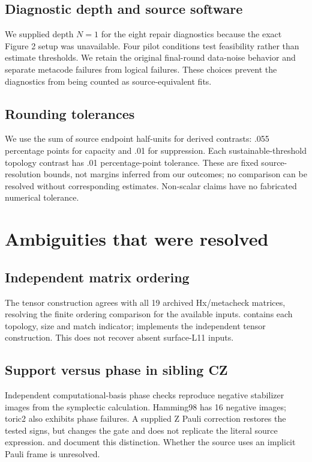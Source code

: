 \subsection{Diagnostic depth and source software}
We supplied depth $N=1$ for the eight repair diagnostics because the exact Figure 2 setup was unavailable. Four pilot conditions test feasibility rather than estimate thresholds. We retain the original final-round data-noise behavior and separate metacode failures from logical failures. These choices prevent the diagnostics from being counted as source-equivalent fits.
\subsection{Rounding tolerances}
We use the sum of source endpoint half-units for derived contrasts: .055 percentage points for capacity and .01 for suppression. Each sustainable-threshold topology contrast has .01 percentage-point tolerance. These are fixed source-resolution bounds, not margins inferred from our outcomes; no comparison can be resolved without corresponding estimates. Non-scalar claims have no fabricated numerical tolerance.

\section{Ambiguities that were resolved}
\subsection{Independent matrix ordering}
The tensor construction agrees with all 19 archived Hx/metacheck matrices, resolving the finite ordering comparison for the available inputs. \href{https://github.com/alectionary/vibe-math/blob/master/formalization/quintavalle-hgp/results/independent_checks.json}{} contains each topology, size and match indicator; \href{https://github.com/alectionary/vibe-math/blob/master/formalization/quintavalle-hgp/analysis/independent_checks.py#L25}{} implements the independent tensor construction. This does not recover absent surface-L11 inputs.
\subsection{Support versus phase in sibling CZ}
Independent computational-basis phase checks reproduce negative stabilizer images from the symplectic calculation. Hamming98 has 16 negative images; toric2 also exhibits phase failures. A supplied Z Pauli correction restores the tested signs, but changes the gate and does not replicate the literal source expression. \href{https://github.com/alectionary/vibe-math/blob/master/formalization/quintavalle-hgp/analysis/independent_checks.py#L73}{} and \href{https://github.com/alectionary/vibe-math/blob/master/formalization/quintavalle-hgp/results/independent_checks.json}{} document this distinction. Whether the source uses an implicit Pauli frame is unresolved.

